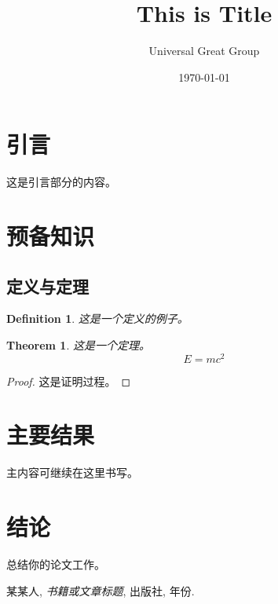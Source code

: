 \documentclass[12pt, a4paper]{article}
\title{\Huge\bfseries This is Title}
\author{\Large Universal Great Group}
\date{\Large \today}
\newtheorem{theorem}{Theorem}[section]
\newtheorem{definition}{Definition}[section]
\begin{document}
\maketitle
\thispagestyle{empty} %
\newpage

\tableofcontents
\newpage

\section{引言}

这是引言部分的内容。

\section{预备知识}

\subsection{定义与定理}

\begin{definition}
这是一个定义的例子。
\end{definition}

\begin{theorem}
这是一个定理。
\[
E=mc^2
\]
\end{theorem}

\begin{proof}
这是证明过程。
\end{proof}

\section{主要结果}

主内容可继续在这里书写。

\section{结论}

总结你的论文工作。

\newpage
\begin{thebibliography}{9}
 某某人, \emph{书籍或文章标题}, 出版社, 年份.
\end{thebibliography}
\end{document}
